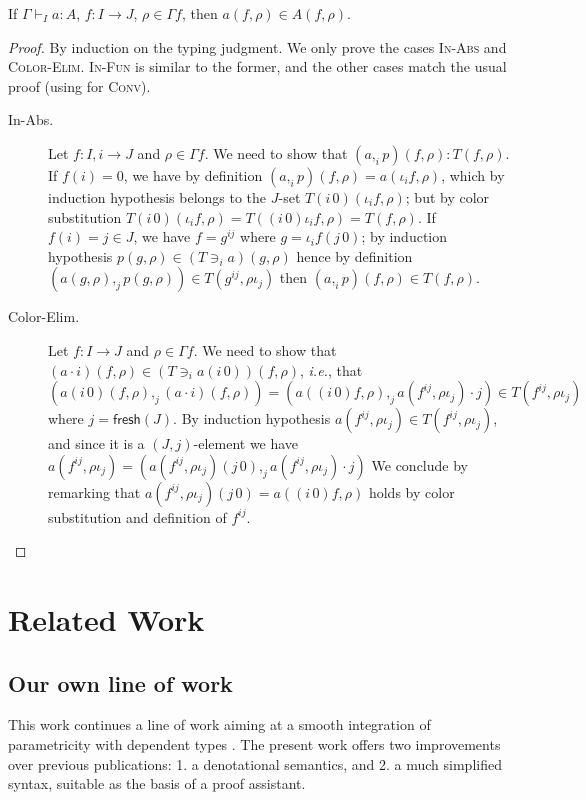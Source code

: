 \documentclass[english]{PaperTools/latex/lipics}
\newcommand\param[1]{\!\cdot\!#1}
\newcommand\op[1]{∋_{#1}}
\def\fresh#1{\mathsf{fresh}(#1)}
\def\ie{\textit{i.e.}}
\begin{document}
\begin{theorem}[Validity]
  If $Γ ⊢_I a : A$, $f : I → J$, $ρ ∈ Γf$, then $a(f,ρ) ∈ A(f,ρ)$.
\end{theorem}
\begin{proof}
  By induction on the typing judgment.  We only prove the cases \textsc{In-Abs} and \textsc{Color-Elim}.  \textsc{In-Fun} is similar to the former, and the other
  cases match the usual proof (using  for \textsc{Conv}).
  \begin{description}
    \item[\sc In-Abs.]
      Let $f : I,i → J$ and $ρ ∈ Γf$.
      We need to show that $(a ,_i p)(f,ρ) : T(f,ρ)$.
      If $f(i) = 0$, we have by definition $(a,_ip)(f,ρ) = a(ι_i f,ρ)$,
      which by induction hypothesis belongs to the $J$-set $T(i\,0)(ι_i f,ρ)$;
      but by color substitution $T(i\,0)(ι_i f,ρ) = T((i\,0)ι_i f,ρ) = T(f,ρ)$.
      If $f(i) = j ∈ J$, we have $f = g^{ij}$ where $g = ι_if(j\,0)$; by induction
      hypothesis $p(g,ρ) ∈ (T \op i a)(g,ρ)$ hence by definition
      $(a(g,ρ) ,_j p(g,ρ)) ∈ T(g^{ij},ρι_j)$ then
      $(a ,_i p)(f,ρ) ∈ T(f,ρ)$.

    \item[\sc Color-Elim.]
      Let $f : I → J$ and $ρ ∈ Γf$.
      We need to show that $(a \param i)(f,ρ) ∈ (T \op i {a(i\,0)}) (f,ρ)$, \ie,
      that
      $ (a(i\,0)(f,ρ) ,_j (a \param i)(f,ρ))
      = (a((i\,0)f,ρ) ,_j a(f^{ij},ρι_j) · j)
      ∈ T(f^{ij},ρι_j)$
      where $j = \fresh J$.
      By induction hypothesis $a(f^{ij},ρι_j) ∈ T(f^{ij},ρι_j)$, and since it is a
      $(J,j)$-element we have
      $a(f^{ij},ρι_j) = (a(f^{ij},ρι_j)(j\,0) ,_j a(f^{ij},ρι_j) · j)$
      We conclude by remarking that $a(f^{ij},ρι_j)(j\,0) = a((i\,0)f,ρ)$ holds
      by color substitution and definition of $f^{ij}$.
    \qedhere
  \end{description}

\end{proof}

\section{Related Work}

\subsection{Our own line of work}
This work continues a line of work aiming at a smooth integration of
parametricity with dependent types
\citep{bernardy_parametricity_2010,bernardy_realizability_2011,bernardy_proofs_2012,bernardy_computational_2012,bernardy_type-theory_2013}. The present work offers two improvements over previous publications:
1. a denotational semantics, and
2. a much simplified syntax, suitable as the basis of a proof assistant.
\end{document}
